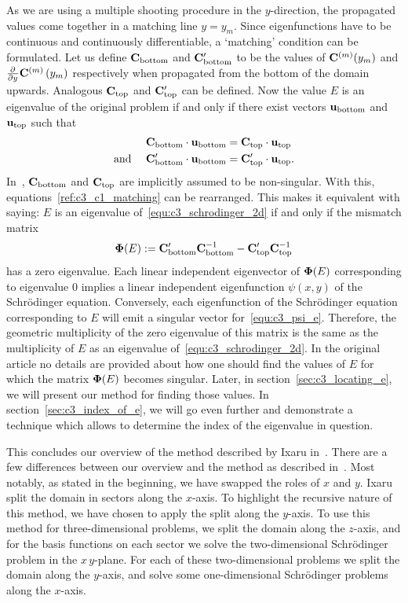 As we are using a multiple shooting procedure in the $y$-direction, the propagated values come together in a matching line $y = y_m$. Since eigenfunctions have to be continuous and continuously differentiable, a `matching' condition can be formulated.  Let us define $\vb{C}_\text{bottom}$ and $\vb{C}_\text{bottom}'$ to be the values of $\vb{C}^{(m)}(y_m)$ and ${\pdv[]{}{y}}\vb{C}^{(m)}\left(y_m\right)$ respectively when propagated from the bottom of the domain upwards. Analogous $\vb{C}_\text{top}$ and $\vb{C}_\text{top}'$ can be defined. Now the value $E$ is an eigenvalue of the original problem if and only if there exist vectors $\vb{u}_\text{bottom}$ and $\vb{u}_\text{top}$ such that
\begin{align}
  \vb{C}_\text{bottom} \cdot \vb{u}_\text{bottom}                   & = \vb{C}_\text{top} \cdot \vb{u}_\text{top}           \nonumber                  \\
  \text{and }\quad \vb{C}_\text{bottom}' \cdot \vb{u}_\text{bottom} & = \vb{C}_\text{top}' \cdot \vb{u}_\text{top} \text{.} \label{ref:c3_c1_matching}
\end{align}
In~\cite{ixaru_new_2010}, $\vb{C}_\text{bottom}$ and $\vb{C}_\text{top}$ are implicitly assumed to be non-singular. With this, equations~\eqref{ref:c3_c1_matching} can be rearranged. This makes it equivalent with saying: $E$ is an eigenvalue of~\eqref{equ:c3_schrodinger_2d} if and only if the mismatch matrix
\begin{equation}\label{equ:c3_psi_e}
  \vb{\Phi}(E) := \vb{C}_\text{bottom}'\vb{C}_\text{bottom}^{-1} - \vb{C}_\text{top}'\vb{C}_\text{top}^{-1}
\end{equation}
has a zero eigenvalue. Each linear independent eigenvector of $\vb{\Phi}(E)$ corresponding to eigenvalue $0$ implies a linear independent eigenfunction $\psi(x, y)$ of the Schrödinger equation. Conversely, each eigenfunction of the Schrödinger equation corresponding to $E$ will emit a singular vector for~\eqref{equ:c3_psi_e}. Therefore, the geometric multiplicity of the zero eigenvalue of this matrix is the same as the multiplicity of $E$ as an eigenvalue of~\eqref{equ:c3_schrodinger_2d}. In the original article no details are provided about how one should find the values of $E$ for which the matrix $\vb{\Phi}(E)$ becomes singular. Later, in section~\ref{sec:c3_locating_e}, we will present our method for finding those values. In section~\ref{sec:c3_index_of_e}, we will go even further and demonstrate a technique which allows to determine the index of the eigenvalue in question.

This concludes our overview of the method described by Ixaru in~\cite{ixaru_new_2010}. There are a few differences between our overview and the method as described in~\cite{ixaru_new_2010}. Most notably, as stated in the beginning, we have swapped the roles of $x$ and $y$. Ixaru split the domain in sectors along the $x$-axis. To highlight the recursive nature of this method, we have chosen to apply the split along the $y$-axis. To use this method for three-dimensional problems, we split the domain along the $z$-axis, and for the basis functions on each sector we solve the two-dimensional Schrödinger problem in the $x\,y$-plane. For each of these two-dimensional problems we split the domain along the $y$-axis, and solve some one-dimensional Schrödinger problems along the $x$-axis.

